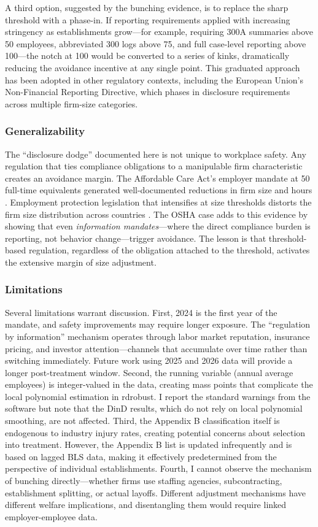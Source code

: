 \documentclass[12pt]{article}
\begin{document}
A third option, suggested by the bunching evidence, is to replace the sharp threshold with a phase-in. If reporting requirements applied with increasing stringency as establishments grow---for example, requiring 300A summaries above 50 employees, abbreviated 300 logs above 75, and full case-level reporting above 100---the notch at 100 would be converted to a series of kinks, dramatically reducing the avoidance incentive at any single point. This graduated approach has been adopted in other regulatory contexts, including the European Union's Non-Financial Reporting Directive, which phases in disclosure requirements across multiple firm-size categories.

\subsubsection*{Generalizability} The ``disclosure dodge'' documented here is not unique to workplace safety. Any regulation that ties compliance obligations to a manipulable firm characteristic creates an avoidance margin. The Affordable Care Act's employer mandate at 50 full-time equivalents generated well-documented reductions in firm size and hours \citep{leung2022}. Employment protection legislation that intensifies at size thresholds distorts the firm size distribution across countries \citep{garicano2016, gourio2014}. The OSHA case adds to this evidence by showing that even \textit{information mandates}---where the direct compliance burden is reporting, not behavior change---trigger avoidance. The lesson is that threshold-based regulation, regardless of the obligation attached to the threshold, activates the extensive margin of size adjustment.

\subsubsection*{Limitations} Several limitations warrant discussion. First, 2024 is the first year of the mandate, and safety improvements may require longer exposure. The ``regulation by information'' mechanism operates through labor market reputation, insurance pricing, and investor attention---channels that accumulate over time rather than switching immediately. Future work using 2025 and 2026 data will provide a longer post-treatment window. Second, the running variable (annual average employees) is integer-valued in the data, creating mass points that complicate the local polynomial estimation in rdrobust. I report the standard warnings from the software but note that the DinD results, which do not rely on local polynomial smoothing, are not affected. Third, the Appendix B classification itself is endogenous to industry injury rates, creating potential concerns about selection into treatment. However, the Appendix B list is updated infrequently and is based on lagged BLS data, making it effectively predetermined from the perspective of individual establishments. Fourth, I cannot observe the mechanism of bunching directly---whether firms use staffing agencies, subcontracting, establishment splitting, or actual layoffs. Different adjustment mechanisms have different welfare implications, and disentangling them would require linked employer-employee data.
\end{document}
